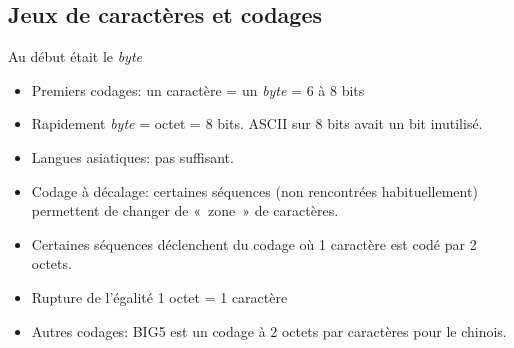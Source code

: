 \subsection{Jeux de caractères et codages}
\begin{frame}{Au début était le \emph{byte}}
  \begin{itemize}
  \item Premiers codages: un caractère = un \emph{byte} = 6 à 8 bits
  \item Rapidement \emph{byte} = octet = 8 bits. ASCII sur 8 bits avait un bit
    inutilisé.
  \item Langues asiatiques: pas suffisant.
  \item Codage à décalage: certaines séquences (non rencontrées
    habituellement) permettent de changer de «~zone~» de caractères.
  \item Certaines séquences déclenchent du codage où 1 caractère est codé par
    2 octets.
  \item Rupture de l'égalité 1 octet = 1 caractère
  \item Autres codages: BIG5 est un codage à 2 octets par caractères pour le
    chinois.
  \end{itemize}
\end{frame}
